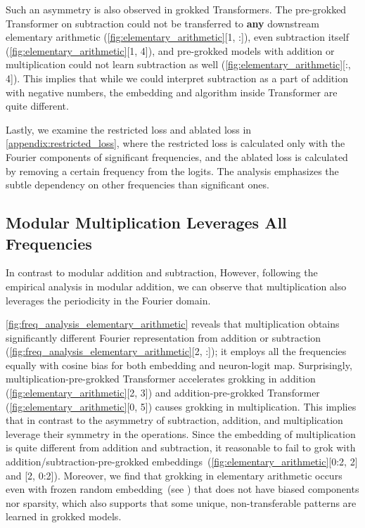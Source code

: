 \documentclass[10pt]{article} %
\newcommand{\update}[1]{{\color{black}{#1}}}
\begin{document}
Such an asymmetry is also observed in grokked Transformers.
The pre-grokked Transformer on subtraction could not be transferred to \textbf{any} downstream elementary arithmetic (\autoref{fig:elementary_arithmetic}[1, :]), even subtraction itself (\autoref{fig:elementary_arithmetic}[1, 4]), and pre-grokked models with addition or multiplication could not learn subtraction as well (\autoref{fig:elementary_arithmetic}[:, 4]).
This implies that while we could interpret subtraction as a part of addition with negative numbers, \update{it is possible that} the embedding and algorithm inside Transformer are quite different.

Lastly, we examine the restricted loss and ablated loss in \cref{appendix:restricted_loss}, where the restricted loss is calculated only with the Fourier components of significant frequencies, and the ablated loss is calculated by removing a certain frequency from the logits.
The analysis emphasizes the subtle dependency on other frequencies than significant ones.


\subsection{Modular Multiplication Leverages All Frequencies}
\label{sec:multiplication}
In contrast to modular addition and subtraction, \update{we do not attempt to fully interpret the learned model in a closed form or a form of pseudocode.}
However, following the empirical analysis in modular addition, we can observe that multiplication also leverages the periodicity in the Fourier domain.

\autoref{fig:freq_analysis_elementary_arithmetic} reveals that multiplication obtains significantly different Fourier representation from addition or subtraction (\autoref{fig:freq_analysis_elementary_arithmetic}[2, :]); it employs all the frequencies equally with cosine bias for both embedding and neuron-logit map.
Surprisingly, multiplication-pre-grokked Transformer accelerates grokking in addition (\autoref{fig:elementary_arithmetic}[2, 3]) and addition-pre-grokked Transformer (\autoref{fig:elementary_arithmetic}[0, 5]) causes grokking in multiplication. This implies that in contrast to the asymmetry of subtraction, addition, and multiplication leverage their symmetry in the operations.
Since the embedding of multiplication is quite different from addition and subtraction, it \update{seems to be} reasonable to fail to grok with addition/subtraction-pre-grokked embeddings~(\autoref{fig:elementary_arithmetic}[0:2, 2] and [2, 0:2]).
Moreover, we find that grokking in elementary arithmetic occurs even with frozen random embedding~(see \Cref{appendix:random}\update{; sampled from the same random seed}) that does not have biased components nor sparsity, which also supports that some unique, non-transferable patterns are learned in grokked models.
\end{document}
